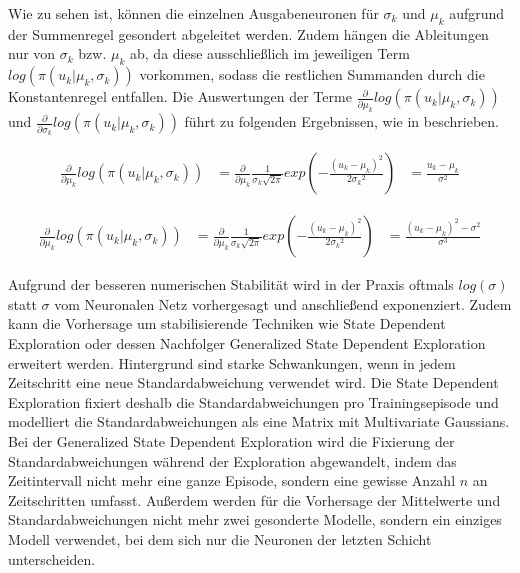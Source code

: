 Wie zu sehen ist, können die einzelnen Ausgabeneuronen für $\sigma_k$ und $\mu_k$
aufgrund der Summenregel gesondert abgeleitet werden. Zudem hängen die Ableitungen
nur von $\sigma_k$ bzw. $\mu_k$ ab, da diese ausschließlich im jeweiligen Term
$log(\pi(u_k | \mu_k, \sigma_k))$ vorkommen, sodass die restlichen Summanden
durch die Konstantenregel entfallen. Die Auswertungen der Terme
$\frac{\partial}{\partial \mu_k} log(\pi(u_k | \mu_k, \sigma_k))$ und
$\frac{\partial}{\partial \sigma_k} log(\pi(u_k | \mu_k, \sigma_k))$ führt zu
folgenden Ergebnissen, wie in \cite{Williams2004SimpleSG} beschrieben.

\begin{equation}
\begin{aligned}
\frac{\partial}{\partial \mu_k} log(\pi(u_k | \mu_k, \sigma_k))
&= \frac{\partial}{\partial \mu_k} \frac{1}{\sigma_k \sqrt{2 \pi}}
    exp\left(-\frac{(u_k - \mu_k)^2}{2 {\sigma_k}^2}\right)
&= \frac{u_k - \mu_k}{\sigma^2}
\end{aligned}
\end{equation}

\begin{equation}
\begin{aligned}
\frac{\partial}{\partial \mu_k} log(\pi(u_k | \mu_k, \sigma_k))
&= \frac{\partial}{\partial \mu_k} \frac{1}{\sigma_k \sqrt{2 \pi}}
    exp\left(-\frac{(u_k - \mu_k)^2}{2 {\sigma_k}^2}\right)
&= \frac{(u_k - \mu_k)^2 - \sigma^2}{\sigma^3}
\end{aligned}
\end{equation}

Aufgrund der besseren numerischen Stabilität wird in der Praxis oftmals $log(\sigma)$
statt $\sigma$ vom Neuronalen Netz vorhergesagt und anschließend exponenziert.
Zudem kann die Vorhersage um stabilisierende Techniken wie State Dependent Exploration
\cite{rueckstiess2008sde} oder dessen Nachfolger Generalized State Dependent
Exploration \cite{raffin2021gsde} erweitert werden. Hintergrund sind starke
Schwankungen, wenn in jedem Zeitschritt eine neue Standardabweichung verwendet wird.
Die State Dependent Exploration fixiert deshalb die Standardabweichungen pro
Trainingsepisode und modelliert die Standardabweichungen als eine Matrix mit
Multivariate Gaussians. Bei der Generalized State Dependent Exploration wird
die Fixierung der Standardabweichungen während der Exploration abgewandelt,
indem das Zeitintervall nicht mehr eine ganze Episode, sondern eine gewisse
Anzahl $n$ an Zeitschritten umfasst. Außerdem werden für die Vorhersage der
Mittelwerte und Standardabweichungen nicht mehr zwei gesonderte Modelle,
sondern ein einziges Modell verwendet, bei dem sich nur die Neuronen der
letzten Schicht unterscheiden.

